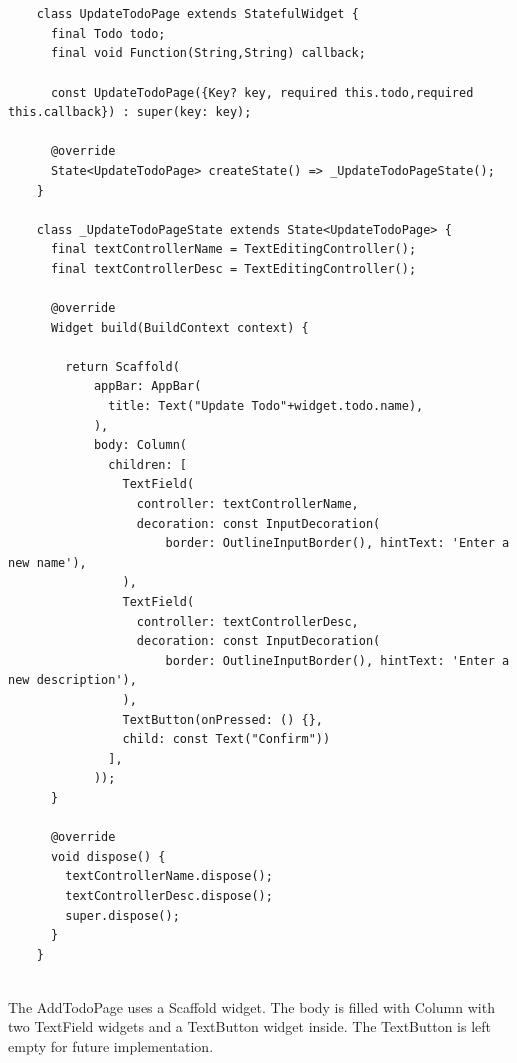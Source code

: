 	\mbox{}\\
	
	 \mbox{}
	\begin{verbatim}
	
	class UpdateTodoPage extends StatefulWidget {
	  final Todo todo;
	  final void Function(String,String) callback;
	
	  const UpdateTodoPage({Key? key, required this.todo,required this.callback}) : super(key: key);
	
	  @override
	  State<UpdateTodoPage> createState() => _UpdateTodoPageState();
	}
	
	class _UpdateTodoPageState extends State<UpdateTodoPage> {
	  final textControllerName = TextEditingController();
	  final textControllerDesc = TextEditingController();
	
	  @override
	  Widget build(BuildContext context) {
	
	    return Scaffold(
	        appBar: AppBar(
	          title: Text("Update Todo"+widget.todo.name),
	        ),
	        body: Column(
	          children: [
	            TextField(
	              controller: textControllerName,
	              decoration: const InputDecoration(
	                  border: OutlineInputBorder(), hintText: 'Enter a new name'),
	            ),
	            TextField(
	              controller: textControllerDesc,
	              decoration: const InputDecoration(
	                  border: OutlineInputBorder(), hintText: 'Enter a new description'),
	            ),
	            TextButton(onPressed: () {},
	            child: const Text("Confirm"))
	          ],
	        ));
	  }
	
	  @override
	  void dispose() {
	    textControllerName.dispose();
	    textControllerDesc.dispose();
	    super.dispose();
	  }
	}
	
	\end{verbatim}
	
	\mbox{}
	
	
	
	The AddTodoPage uses a Scaffold widget. The body is filled with Column with two TextField widgets and a TextButton widget inside. The TextButton is left empty for future implementation.
	
	\mbox{}\\
	
